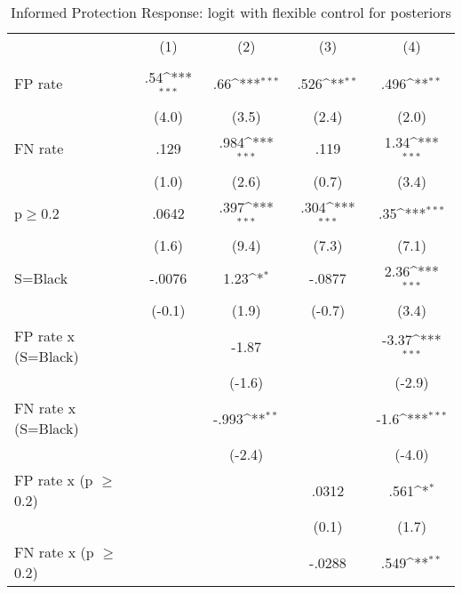 \begin{table}[htbp]\centering
\def\sym#1{\ifmmode^{#1}\else\(^{#1}\)\fi}
\caption{Informed Protection Response: logit with flexible control for posteriors}
\begin{tabular}{l*{4}{c}}
\hline\hline
                &\multicolumn{1}{c}{(1)}&\multicolumn{1}{c}{(2)}&\multicolumn{1}{c}{(3)}&\multicolumn{1}{c}{(4)}\\
                &\multicolumn{1}{c}{}&\multicolumn{1}{c}{}&\multicolumn{1}{c}{}&\multicolumn{1}{c}{}\\
\hline
FP rate         &      .54\sym{***}&      .66\sym{***}&     .526\sym{**} &     .496\sym{**} \\
                &    (4.0)         &    (3.5)         &    (2.4)         &    (2.0)         \\
FN rate         &     .129         &     .984\sym{***}&     .119         &     1.34\sym{***}\\
                &    (1.0)         &    (2.6)         &    (0.7)         &    (3.4)         \\
p$\geq$0.2      &    .0642         &     .397\sym{***}&     .304\sym{***}&      .35\sym{***}\\
                &    (1.6)         &    (9.4)         &    (7.3)         &    (7.1)         \\
S=Black         &   -.0076         &     1.23\sym{*}  &   -.0877         &     2.36\sym{***}\\
                &   (-0.1)         &    (1.9)         &   (-0.7)         &    (3.4)         \\
FP rate x (S=Black)&                  &    -1.87         &                  &    -3.37\sym{***}\\
                &                  &   (-1.6)         &                  &   (-2.9)         \\
FN rate x (S=Black)&                  &    -.993\sym{**} &                  &     -1.6\sym{***}\\
                &                  &   (-2.4)         &                  &   (-4.0)         \\
FP rate x (p $\geq$ 0.2)&                  &                  &    .0312         &     .561\sym{*}  \\
                &                  &                  &    (0.1)         &    (1.7)         \\
FN rate x (p $\geq$ 0.2)&                  &                  &   -.0288         &     .549\sym{**} \\

\end{tabular}
\end{table}
